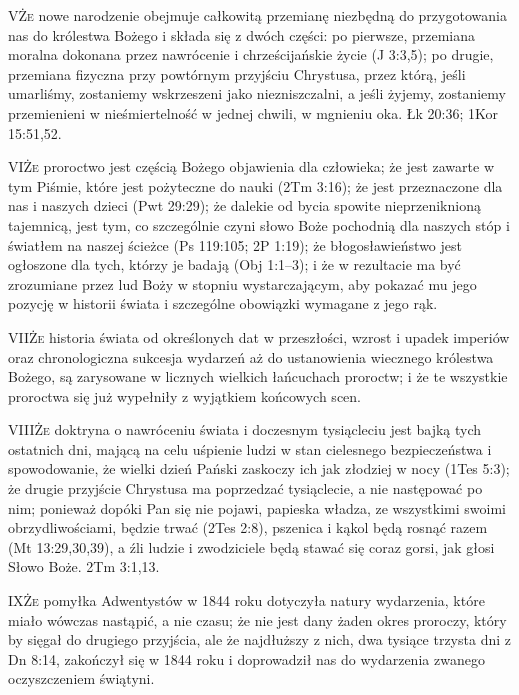 \lettrine{V}{Że} nowe narodzenie obejmuje całkowitą przemianę niezbędną do przygotowania nas do królestwa Bożego i składa się z dwóch części: po pierwsze, przemiana moralna dokonana przez nawrócenie i chrześcijańskie życie (J 3:3,5); po drugie, przemiana fizyczna przy powtórnym przyjściu Chrystusa, przez którą, jeśli umarliśmy, zostaniemy wskrzeszeni jako niezniszczalni, a jeśli żyjemy, zostaniemy przemienieni w nieśmiertelność w jednej chwili, w mgnieniu oka. Łk 20:36; 1Kor 15:51,52.

\lettrine{VI}{Że} proroctwo jest częścią Bożego objawienia dla człowieka; że jest zawarte w tym Piśmie, które jest pożyteczne do nauki (2Tm 3:16); że jest przeznaczone dla nas i naszych dzieci (Pwt 29:29); że dalekie od bycia spowite nieprzeniknioną tajemnicą, jest tym, co szczególnie czyni słowo Boże pochodnią dla naszych stóp i światłem na naszej ścieżce (Ps 119:105; 2P 1:19); że błogosławieństwo jest ogłoszone dla tych, którzy je badają (Obj 1:1--3); i że w rezultacie ma być zrozumiane przez lud Boży w stopniu wystarczającym, aby pokazać mu jego pozycję w historii świata i szczególne obowiązki wymagane z jego rąk.

\lettrine{VII}{Że} historia świata od określonych dat w przeszłości, wzrost i upadek imperiów oraz chronologiczna sukcesja wydarzeń aż do ustanowienia wiecznego królestwa Bożego, są zarysowane w licznych wielkich łańcuchach proroctw; i że te wszystkie proroctwa się już wypełniły z wyjątkiem końcowych scen.

\lettrine{VIII}{Że} doktryna o nawróceniu świata i doczesnym tysiącleciu jest bajką tych ostatnich dni, mającą na celu uśpienie ludzi w stan cielesnego bezpieczeństwa i spowodowanie, że wielki dzień Pański zaskoczy ich jak złodziej w nocy (1Tes 5:3); że drugie przyjście Chrystusa ma poprzedzać tysiąclecie, a nie następować po nim; ponieważ dopóki Pan się nie pojawi, papieska władza, ze wszystkimi swoimi obrzydliwościami, będzie trwać (2Tes 2:8), pszenica i kąkol będą rosnąć razem (Mt 13:29,30,39), a źli ludzie i zwodziciele będą stawać się coraz gorsi, jak głosi Słowo Boże. 2Tm 3:1,13.

\lettrine{IX}{Że} pomyłka Adwentystów w 1844 roku dotyczyła natury wydarzenia, które miało wówczas nastąpić, a nie czasu; że nie jest dany żaden okres proroczy, który by sięgał do drugiego przyjścia, ale że najdłuższy z nich, dwa tysiące trzysta dni z Dn 8:14, zakończył się w 1844 roku i doprowadził nas do wydarzenia zwanego oczyszczeniem świątyni.


